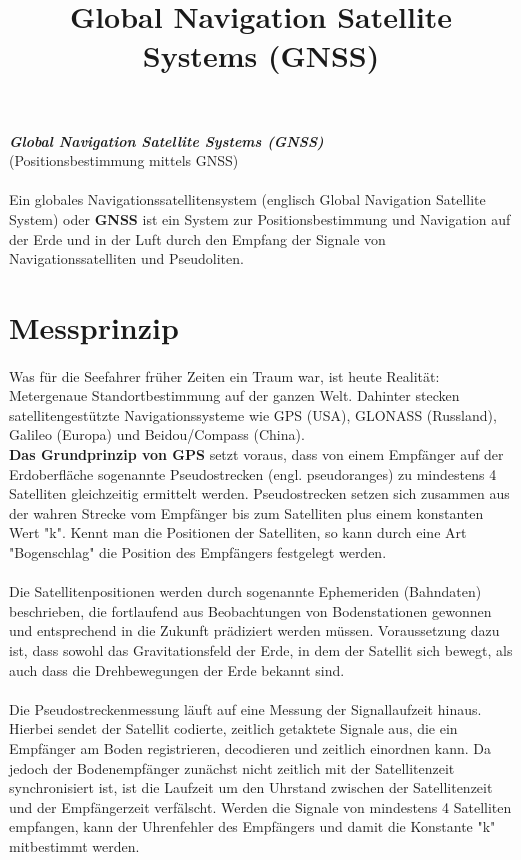 \documentclass[12pt,a4paper]{article}
\title{Global Navigation Satellite Systems (GNSS)}
\begin{document}
\emph{\textbf{\large{Global Navigation Satellite Systems (GNSS)}}}
\\(Positionsbestimmung mittels GNSS)
\\ \\
  Ein globales Navigationssatellitensystem (englisch Global Navigation Satellite System) oder \textbf{GNSS} ist ein System zur Positionsbestimmung und Navigation auf der Erde und in der Luft durch den Empfang der Signale von Navigationssatelliten und Pseudoliten. 


\section{Messprinzip}
\paragraph{}
Was für die Seefahrer früher Zeiten ein Traum war, ist heute Realität: Metergenaue Standortbestimmung auf der ganzen Welt. Dahinter stecken satellitengestützte Navigationssysteme wie GPS (USA), GLONASS (Russland), Galileo (Europa) und Beidou/Compass (China).\\
\textbf{Das Grundprinzip von GPS} setzt voraus, dass von einem Empfänger auf der Erdoberfläche sogenannte Pseudostrecken (engl. pseudoranges) zu mindestens 4 Satelliten gleichzeitig ermittelt werden. Pseudostrecken setzen sich zusammen aus der wahren Strecke vom Empfänger bis zum Satelliten plus einem konstanten Wert "k". Kennt man die Positionen der Satelliten, so kann durch eine Art "Bogenschlag" die Position des Empfängers festgelegt werden. \\ \\Die Satellitenpositionen werden durch sogenannte Ephemeriden (Bahndaten) beschrieben, die fortlaufend aus Beobachtungen von Bodenstationen gewonnen und entsprechend in die Zukunft prädiziert werden müssen. Voraussetzung dazu ist, dass sowohl das Gravitationsfeld der Erde, in dem der Satellit sich bewegt, als auch dass die Drehbewegungen der Erde bekannt sind.

\paragraph{}
Die Pseudostreckenmessung läuft auf eine Messung der Signallaufzeit hinaus. Hierbei sendet der Satellit codierte, zeitlich getaktete Signale aus, die ein Empfänger am Boden registrieren, decodieren und zeitlich einordnen kann. Da jedoch der Bodenempfänger zunächst nicht zeitlich mit der Satellitenzeit synchronisiert ist, ist die Laufzeit um den Uhrstand zwischen der Satellitenzeit und der Empfängerzeit verfälscht. Werden die Signale von mindestens 4 Satelliten empfangen, kann der Uhrenfehler des Empfängers und damit die Konstante "k" mitbestimmt werden.
\end{document}
